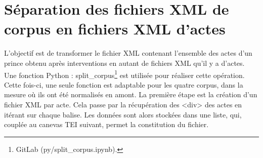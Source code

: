 \section[Séparation des fichiers]{Séparation des fichiers XML de corpus en fichiers XML d’actes}
\label{III.5.3}

\par L'objectif est de transformer le fichier XML contenant l'ensemble des actes d'un prince obtenu après interventions en autant de fichiers XML qu'il y a d'actes. Une fonction Python : split\_corpus\footnote{GitLab (py/split\_corpus.ipynb).} est utilisée pour réaliser cette opération. Cette fois-ci, une seule fonction est adaptable pour les quatre corpus, dans la mesure où ils ont été normalisés en amont. La première étape est la création d'un fichier XML par acte. Cela passe par la récupération des <div> des actes en itérant sur chaque balise. Les données sont alors stockées dans une liste, qui, couplée au canevas TEI suivant, permet la constitution du fichier.
\newline 

